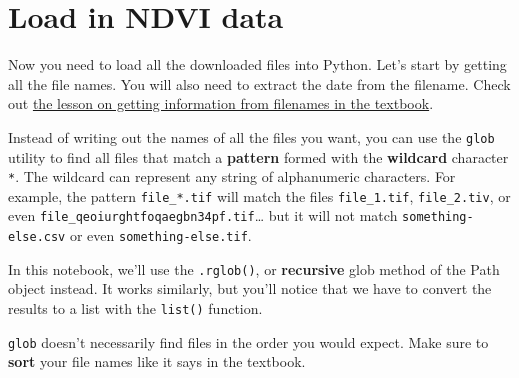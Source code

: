 \documentclass[
  letterpaper,
  DIV=11,
  numbers=noendperiod,
  oneside]{scrreprt}
\begin{document}
\section{Load in NDVI data}\label{load-in-ndvi-data-1}

Now you need to load all the downloaded files into Python. Let's start
by getting all the file names. You will also need to extract the date
from the filename. Check out
\href{https://www.earthdatascience.org/courses/intro-to-earth-data-science/write-efficient-python-code/loops/data-workflows-with-loops/}{the
lesson on getting information from filenames in the textbook}.

Instead of writing out the names of all the files you want, you can use
the \texttt{glob} utility to find all files that match a
\textbf{pattern} formed with the \textbf{wildcard} character \texttt{*}.
The wildcard can represent any string of alphanumeric characters. For
example, the pattern
\texttt{\textquotesingle{}file\_*.tif\textquotesingle{}} will match the
files \texttt{\textquotesingle{}file\_1.tif\textquotesingle{}},
\texttt{\textquotesingle{}file\_2.tiv\textquotesingle{}}, or even
\texttt{\textquotesingle{}file\_qeoiurghtfoqaegbn34pf.tif\textquotesingle{}}\ldots{}
but it will not match
\texttt{\textquotesingle{}something-else.csv\textquotesingle{}} or even
\texttt{\textquotesingle{}something-else.tif\textquotesingle{}}.

In this notebook, we'll use the \texttt{.rglob()}, or \textbf{recursive}
glob method of the Path object instead. It works similarly, but you'll
notice that we have to convert the results to a list with the
\texttt{list()} function.

\begin{tcolorbox}[enhanced jigsaw, colbacktitle=quarto-callout-caution-color!10!white, opacityback=0, bottomtitle=1mm, toptitle=1mm, bottomrule=.15mm, left=2mm, colframe=quarto-callout-caution-color-frame, leftrule=.75mm, opacitybacktitle=0.6, colback=white, rightrule=.15mm, toprule=.15mm, breakable, titlerule=0mm, title=\textcolor{quarto-callout-caution-color}{\faFire}\hspace{0.5em}{GOTCHA ALERT!}, coltitle=black, arc=.35mm]

\texttt{glob} doesn't necessarily find files in the order you would
expect. Make sure to \textbf{sort} your file names like it says in the
textbook.

\end{tcolorbox}
\end{document}
